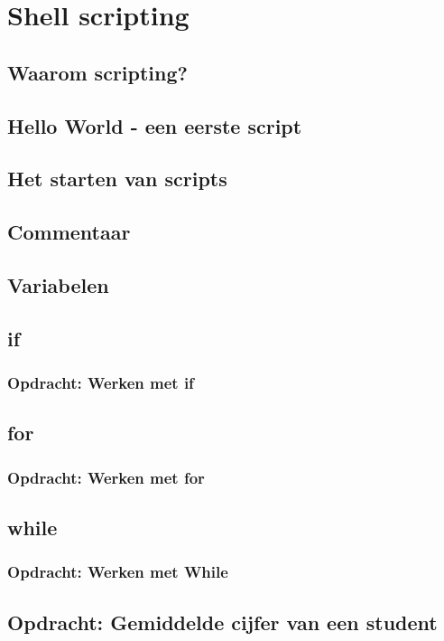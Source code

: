 \documentclass[a4paper,12pt,twoside,openright,titlepage]{book}
\begin{document}
\chapter{Shell scripting}

\section{Waarom scripting?}

\section{Hello World - een eerste script}

\section{Het starten van scripts}

\section{Commentaar}

\section{Variabelen}

\section{if}

\subsection{Opdracht: Werken met if}

\section{for}

\subsection{Opdracht: Werken met for}

\section{while}

\subsection{Opdracht: Werken met While}

\section{Opdracht: Gemiddelde cijfer van een student}


\backmatter
\printindex
\end{document}
